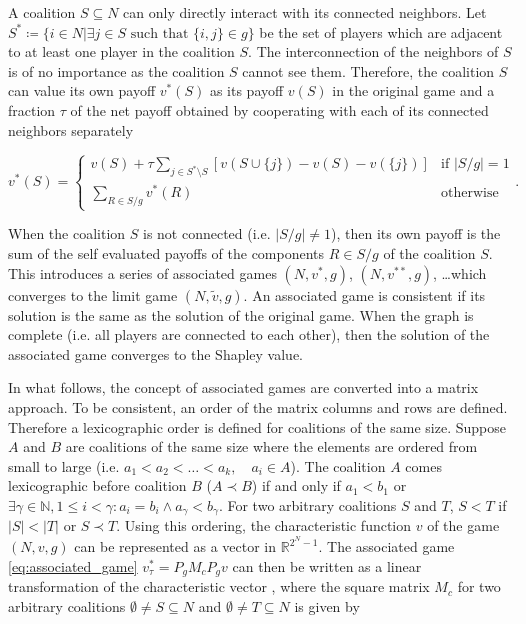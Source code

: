 A coalition $S \subseteq N$ can only directly interact with its connected neighbors. Let
$S^* \coloneqq \{ i \in N | \exists j \in S \text{ such that } \{i, j\} \in g \}$ be the set of players
which are adjacent to at least one player in the coalition $S$. The interconnection of the neighbors of
$S$ is of no importance as the coalition $S$ cannot see them. Therefore, the coalition $S$ can value its
own payoff $v^*(S)$ as its payoff $v(S)$ in the original game and a fraction $\tau$ of the net payoff obtained
by cooperating with each of its connected neighbors separately\cite{hamiache2001associated}


\begin{equation}
	\label{eq:associated_game}
	v^*(S) =
	\begin{cases}
		\displaystyle
		v(S) + \tau \sum_{j \in S^* \setminus S} \left[ v(S \cup \{j\}) - v(S) - v(\{j\}) \right] & \text{if } |S/g| = 1 \\
		\displaystyle
		\sum_{R \in S/g} v^*(R)                                                                   & \text{otherwise}
	\end{cases}
	.
\end{equation}

When the coalition $S$ is not connected (i.e. $|S/g| \ne 1$), then its own payoff is the sum of the self
evaluated payoffs of the components $R \in S/g$ of the coalition $S$.
This introduces a series of associated games $(N, v^*, g)$, $(N, v^{**}, g)$, \dots which converges
to the limit game $(N, \tilde{v}, g)$. An associated game is consistent if its solution is the same
as the solution of the original game. When the graph is complete (i.e. all players are connected to
each other), then the solution of the associated game converges to the Shapley value.\cite{hamiache2001associated}


In what follows, the concept of associated games are converted into a matrix approach.
To be consistent, an order of the matrix columns and rows are defined. Therefore a lexicographic order is defined
for coalitions of the same size. Suppose $A$ and $B$ are coalitions of the same size where the elements are ordered
from small to large (i.e. $a_1 < a_2 < \dots < a_k, \quad a_i \in A$). The coalition $A$ comes lexicographic
before coalition $B$ ($A \prec B$) if and only if $a_1 < b_1$ or $\exists \gamma \in \mathbb{N}, 1 \le i < \gamma: a_i = b_i \land a_\gamma < b_\gamma$.
For two arbitrary coalitions $S$ and $T$, $S < T$ if $|S| < |T|$ or $S \prec T$. Using this ordering, the characteristic
function $v$ of the game $(N, v, g)$ can be represented as a vector in $\mathbb{R}^{2^N - 1}$. The associated game
\cref{eq:associated_game} $v^*_\tau = P_g M_c P_g v$ can then be written as a linear transformation of the characteristic vector
, where the square matrix $M_c$ for two arbitrary coalitions $\emptyset \ne S \subseteq N$
and $\emptyset \ne T \subseteq N$ is given by\cite{hamiache_associated_2020,hamiache2010matrix}


